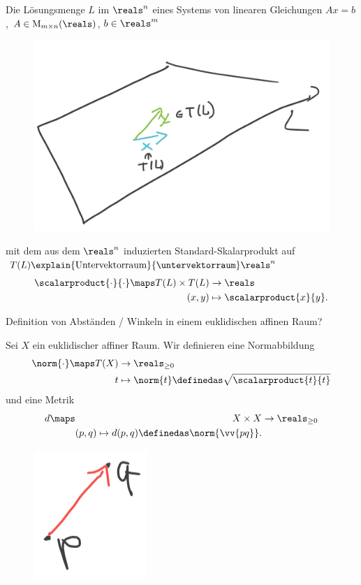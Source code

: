 \begin{beispiel}
  Die Lösungsmenge \( L \) im \( \reals^n \) eines Systems von linearen Gleichungen \( Ax=b \), \( A\in \Mat_{m \times n}(\reals) \), \( b\in \reals^m \)
  \begin{figure}[H]
    \centering
    \includegraphics[width=0.5\linewidth]{figures/hyperebene_beispiel_euklidischer_affiner_raum}
    \label{fig:hyperebene_beispiel_euklidischer_affiner_raum}
  \end{figure}
  mit dem aus dem \( \reals^n \) induzierten Standard-Skalarprodukt auf \( T(L)\explain{\text{Untervektorraum}}{\untervektorraum}\reals^n \)
  \begin{equation*}
    \scalarproduct{\cdot}{\cdot}\maps \begin{aligned}[t]
      T(L)\times T(L)&\to \reals\\
      (x,y) &\mapsto \scalarproduct{x}{y}.
    \end{aligned}
  \end{equation*}
\end{beispiel}
\begin{frage*}
  Definition von Abständen / Winkeln in einem euklidischen affinen Raum?
\end{frage*}
\begin{definition}
  Sei \( X \) ein euklidischer affiner Raum. Wir definieren eine Normabbildung
  \begin{equation*}
    \norm{\cdot}\maps \begin{aligned}[t]
      T(X)&\to \reals_{\geq 0}\\
      t&\mapsto \norm{t}\definedas \sqrt{\scalarproduct{t}{t}}
    \end{aligned}
  \end{equation*}
  und eine Metrik
  \begin{equation*}
    d\maps \begin{aligned}[t]
      X\times X&\to \reals_{\geq 0}\\
      (p,q)\mapsto d(p,q)\definedas \norm{\vv{pq}}.
    \end{aligned}
  \end{equation*}
  \begin{figure}[H]
    \centering
    \includegraphics[width=0.2\linewidth]{figures/metrik_auf_affinem_raum_visualisierung}
    \label{fig:metrik_auf_affinem_raum_visualisierung}
  \end{figure}
\end{definition}
